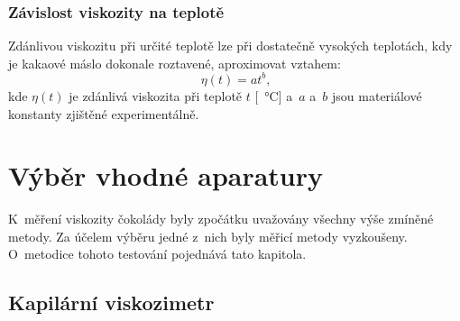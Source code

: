 \documentclass[12pt]{article}
\begin{document}
\subsubsection{Závislost viskozity na teplotě}%

Zdánlivou viskozitu při určité teplotě lze při dostatečně vysokých teplotách, kdy je kakaové máslo dokonale roztavené, aproximovat vztahem:~\cite{article:Rheological_behaviour_chocolate_temeperature}
\begin{equation}
    \eta(t) = at^b\text{,}
\end{equation}
kde $\eta(t)$ je zdánlivá viskozita při teplotě $t$ [\SI{}{\degreeCelsius}] a~$a$ a~$b$ jsou materiálové konstanty zjištěné experimentálně.

\newpage%
\section{Výběr vhodné aparatury}%

K~měření viskozity čokolády byly zpočátku uvažovány všechny výše zmíněné metody. Za účelem výběru jedné z~nich byly měřicí metody vyzkoušeny. O~metodice tohoto testování pojednává tato kapitola.

\subsection{Kapilární viskozimetr}%
\end{document}
